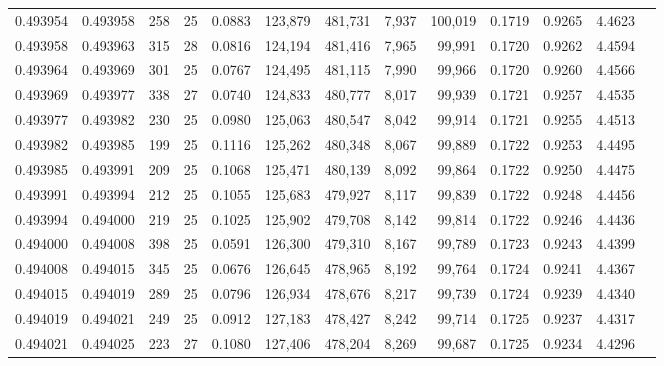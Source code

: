 \begin{tabular}{rrrrrrrrrrrrr}
0.493954 & 0.493958 & 258 &  25 &                                     0.0883 & 123,879 & 481,731 &   7,937 & 100,019 & 0.1719 & 0.9265 & 4.4623 \\
0.493958 & 0.493963 & 315 &  28 &                                     0.0816 & 124,194 & 481,416 &   7,965 &  99,991 & 0.1720 & 0.9262 & 4.4594 \\
0.493964 & 0.493969 & 301 &  25 &                                     0.0767 & 124,495 & 481,115 &   7,990 &  99,966 & 0.1720 & 0.9260 & 4.4566 \\
0.493969 & 0.493977 & 338 &  27 &                                     0.0740 & 124,833 & 480,777 &   8,017 &  99,939 & 0.1721 & 0.9257 & 4.4535 \\
0.493977 & 0.493982 & 230 &  25 &                                     0.0980 & 125,063 & 480,547 &   8,042 &  99,914 & 0.1721 & 0.9255 & 4.4513 \\
0.493982 & 0.493985 & 199 &  25 &                                     0.1116 & 125,262 & 480,348 &   8,067 &  99,889 & 0.1722 & 0.9253 & 4.4495 \\
0.493985 & 0.493991 & 209 &  25 &                                     0.1068 & 125,471 & 480,139 &   8,092 &  99,864 & 0.1722 & 0.9250 & 4.4475 \\
0.493991 & 0.493994 & 212 &  25 &                                     0.1055 & 125,683 & 479,927 &   8,117 &  99,839 & 0.1722 & 0.9248 & 4.4456 \\
0.493994 & 0.494000 & 219 &  25 &                                     0.1025 & 125,902 & 479,708 &   8,142 &  99,814 & 0.1722 & 0.9246 & 4.4436 \\
0.494000 & 0.494008 & 398 &  25 &                                     0.0591 & 126,300 & 479,310 &   8,167 &  99,789 & 0.1723 & 0.9243 & 4.4399 \\
0.494008 & 0.494015 & 345 &  25 &                                     0.0676 & 126,645 & 478,965 &   8,192 &  99,764 & 0.1724 & 0.9241 & 4.4367 \\
0.494015 & 0.494019 & 289 &  25 &                                     0.0796 & 126,934 & 478,676 &   8,217 &  99,739 & 0.1724 & 0.9239 & 4.4340 \\
0.494019 & 0.494021 & 249 &  25 &                                     0.0912 & 127,183 & 478,427 &   8,242 &  99,714 & 0.1725 & 0.9237 & 4.4317 \\
0.494021 & 0.494025 & 223 &  27 &                                     0.1080 & 127,406 & 478,204 &   8,269 &  99,687 & 0.1725 & 0.9234 & 4.4296 \\

\end{tabular}
